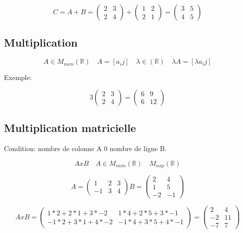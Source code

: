 \documentclass{article}
\begin{document}
\[
C = A + B =
  \begin{pmatrix}
    2 & 3 \\
    2 & 4
  \end{pmatrix}
+
  \begin{pmatrix}
    1 & 2  \\
    2 & 1
  \end{pmatrix}
  =
  \begin{pmatrix}
    3 & 5  \\
    4 & 5
  \end{pmatrix}
\]

\subsection{Multiplication}
\[A \in M_{mxn}(\mathbb{R}) \quad A = [a_ij] \quad \lambda \in (\mathbb{R}) \quad \lambda A = [\lambda a_ij] \]

Exemple:

\[
3
  \begin{pmatrix}
    2 & 3 \\
    2 & 4
  \end{pmatrix}
  =
  \begin{pmatrix}
    6 & 9  \\
    6 & 12
  \end{pmatrix}
\]
\subsection{Multiplication matricielle}
Condition: nombre de colonne A 0 nombre de ligne B.

\[ AxB \quad A \in M_{mxn}(\mathbb{R}) \quad M_{nxp}(\mathbb{R})\]

\[
A=
  \begin{pmatrix}
    1 & 2 & 3 \\
    -1 & 3 & 4
  \end{pmatrix}
B =
  \begin{pmatrix}
    2 & 4 \\
    1 & 5  \\
		-2 & -1
  \end{pmatrix}
\]

\[
AxB=
  \begin{pmatrix}
    1*2+2*1+3*-2 & 1*4+2*5+3*-1 \\
    -1*2+3*1+4*-2 & -1*4+3*5+4*-1
  \end{pmatrix}
=
  \begin{pmatrix}
    2 & 4\\
    -2 & 11  \\
		-7 & 7
  \end{pmatrix}
\]
\end{document}
